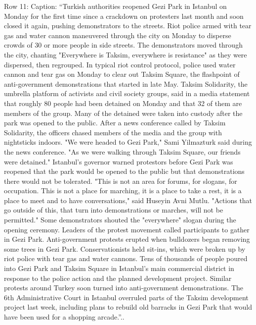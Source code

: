 \begin{table}[H]
\centering
\caption{Row 11\ifshowcaption{}: Caption: ``Turkish authorities reopened Gezi Park in Istanbul on Monday for the first time since a crackdown on protesters last month and soon closed it again, pushing demonstrators to the streets. Riot police armed with tear gas and water cannon maneuvered through the city on Monday to disperse crowds of 30 or more people in side streets. The demonstrators moved through the city, chanting "Everywhere is Taksim, everywhere is resistance" as they were dispersed, then regrouped. In typical riot control protocol, police used water cannon and tear gas on Monday to clear out Taksim Square, the flashpoint of anti-government demonstrations that started in late May. Taksim Solidarity, the umbrella platform of activists and civil society groups, said in a media statement that roughly 80 people had been detained on Monday and that 32 of them are members of the group. Many of the detained were taken into custody after the park was opened to the public. After a news conference called by Taksim Solidarity, the officers chased members of the media and the group with nightsticks indoors. "We were headed to Gezi Park," Sami Yilmazturk said during the news conference. "As we were walking through Taksim Square, our friends were detained." Istanbul's governor warned protestors before Gezi Park was reopened that the park would be opened to the public but that demonstrations there would not be tolerated. "This is not an area for forums, for slogans, for occupation. This is not a place for marching, it is a place to take a rest, it is a place to meet and to have conversations," said Huseyin Avni Mutlu. "Actions that go outside of this, that turn into demonstrations or marches, will not be permitted." Some demonstrators shouted the "everywhere" slogan during the opening ceremony. Leaders of the protest movement called participants to gather in Gezi Park. Anti-government protests erupted when bulldozers began removing some trees in Gezi Park. Conservationists held sit-ins, which were broken up by riot police with tear gas and water cannons. Tens of thousands of people poured into Gezi Park and Taksim Square in Istanbul's main commercial district in response to the police action and the planned development project. Similar protests around Turkey soon turned into anti-government demonstrations. The 6th Administrative Court in Istanbul overruled parts of the Taksim development project last week, including plans to rebuild old barracks in Gezi Park that would have been used for a shopping arcade.''.\else.}

\end{table}
